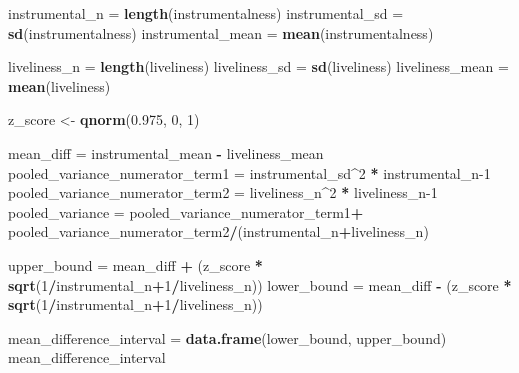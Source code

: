 \documentclass[
]{article}
\newenvironment{Shaded}{\begin{snugshade}}{\end{snugshade}}
\newcommand{\DecValTok}[1]{\textcolor[rgb]{0.00,0.00,0.81}{#1}}
\newcommand{\FloatTok}[1]{\textcolor[rgb]{0.00,0.00,0.81}{#1}}
\newcommand{\KeywordTok}[1]{\textcolor[rgb]{0.13,0.29,0.53}{\textbf{#1}}}
\newcommand{\NormalTok}[1]{#1}
\newcommand{\OperatorTok}[1]{\textcolor[rgb]{0.81,0.36,0.00}{\textbf{#1}}}
\newcommand{\StringTok}[1]{\textcolor[rgb]{0.31,0.60,0.02}{#1}}
\begin{document}
\begin{Shaded}
\begin{Highlighting}[]
\NormalTok{instrumental_n =}\StringTok{ }\KeywordTok{length}\NormalTok{(instrumentalness)}
\NormalTok{instrumental_sd =}\StringTok{ }\KeywordTok{sd}\NormalTok{(instrumentalness)}
\NormalTok{instrumental_mean =}\StringTok{ }\KeywordTok{mean}\NormalTok{(instrumentalness)}

\NormalTok{liveliness_n =}\StringTok{ }\KeywordTok{length}\NormalTok{(liveliness)}
\NormalTok{liveliness_sd =}\StringTok{ }\KeywordTok{sd}\NormalTok{(liveliness)}
\NormalTok{liveliness_mean =}\StringTok{ }\KeywordTok{mean}\NormalTok{(liveliness)}

\NormalTok{z_score <-}\StringTok{ }\KeywordTok{qnorm}\NormalTok{(}\FloatTok{0.975}\NormalTok{, }\DecValTok{0}\NormalTok{, }\DecValTok{1}\NormalTok{)}

\NormalTok{mean_diff =}\StringTok{ }\NormalTok{instrumental_mean }\OperatorTok{-}\StringTok{ }\NormalTok{liveliness_mean}
\NormalTok{pooled_variance_numerator_term1 =}\StringTok{ }\NormalTok{instrumental_sd}\OperatorTok{^}\DecValTok{2} \OperatorTok{*}\StringTok{ }\NormalTok{instrumental_n}\DecValTok{-1}
\NormalTok{pooled_variance_numerator_term2 =}\StringTok{ }\NormalTok{liveliness_n}\OperatorTok{^}\DecValTok{2} \OperatorTok{*}\StringTok{ }\NormalTok{liveliness_n}\DecValTok{-1}
\NormalTok{pooled_variance =}\StringTok{ }\NormalTok{pooled_variance_numerator_term1}\OperatorTok{+}
\StringTok{  }\NormalTok{pooled_variance_numerator_term2}\OperatorTok{/}\NormalTok{(instrumental_n}\OperatorTok{+}\NormalTok{liveliness_n)}


\NormalTok{upper_bound =}\StringTok{ }\NormalTok{mean_diff }\OperatorTok{+}\StringTok{ }\NormalTok{(z_score }\OperatorTok{*}\StringTok{ }\KeywordTok{sqrt}\NormalTok{(}\DecValTok{1}\OperatorTok{/}\NormalTok{instrumental_n}\OperatorTok{+}\DecValTok{1}\OperatorTok{/}\NormalTok{liveliness_n))}
\NormalTok{lower_bound =}\StringTok{ }\NormalTok{mean_diff }\OperatorTok{-}\StringTok{ }\NormalTok{(z_score }\OperatorTok{*}\StringTok{ }\KeywordTok{sqrt}\NormalTok{(}\DecValTok{1}\OperatorTok{/}\NormalTok{instrumental_n}\OperatorTok{+}\DecValTok{1}\OperatorTok{/}\NormalTok{liveliness_n))}

\NormalTok{mean_difference_interval =}\StringTok{ }\KeywordTok{data.frame}\NormalTok{(lower_bound, upper_bound)}
\NormalTok{mean_difference_interval}
\end{Highlighting}
\end{Shaded}
\end{document}
